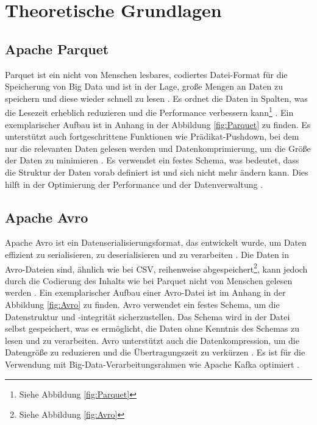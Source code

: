 \chapter{Theoretische Grundlagen}

\section{Apache Parquet}
Parquet ist ein nicht von Menschen lesbares, codiertes Datei-Format für die Speicherung von Big Data und ist in der Lage, große Mengen an Daten zu speichern und diese wieder schnell zu lesen \cite{apache_apache_nodate} \cite[S. 906]{gohil_compendious_2022}. Es ordnet die Daten in Spalten, was die Lesezeit erheblich reduzieren und die Performance verbessern kann\footnote{Siehe Abbildung \ref{fig:Parquet}} \cite[S. 339]{munir_cost-based_2020}. Ein exemplarischer Aufbau ist in Anhang in der Abbildung \ref{fig:Parquet} zu finden. Es unterstützt auch fortgeschrittene Funktionen wie Prädikat-Pushdown, bei dem nur die relevanten Daten gelesen werden und Datenkomprimierung, um die Größe der Daten zu minimieren \cite[S. 268]{plase_comparison_2017}. Es verwendet ein festes Schema, was bedeutet, dass die Struktur der Daten vorab definiert ist und sich nicht mehr ändern kann. Dies hilft in der Optimierung der Performance und der Datenverwaltung \cite{apache_apache_nodate}.

\section{Apache Avro}
Apache Avro ist ein Datenserialisierungsformat, das entwickelt wurde, um Daten effizient zu serialisieren, zu deserialisieren und zu verarbeiten \cite{apache_avro_nodate}. Die Daten in Avro-Dateien sind, ähnlich wie bei CSV, reihenweise abgespeichert\footnote{Siehe Abbildung \ref{fig:Avro}}, kann jedoch durch die Codierung des Inhalts wie bei Parquet nicht von Menschen gelesen werden \cite[S. 338]{munir_cost-based_2020} \cite[S. 906]{gohil_compendious_2022}. Ein exemplarischer Aufbau einer Avro-Datei ist im Anhang in der Abbildung \ref{fig:Avro} zu finden. Avro verwendet ein festes Schema, um die Datenstruktur und -integrität sicherzustellen. Das Schema wird in der Datei selbst gespeichert, was es ermöglicht, die Daten ohne Kenntnis des Schemas zu lesen und zu verarbeiten. Avro unterstützt auch die Datenkompression, um die Datengröße zu reduzieren und die Übertragungszeit zu verkürzen \cite[S. 268]{plase_comparison_2017}. Es ist für die Verwendung mit Big-Data-Verarbeitungsrahmen wie Apache Kafka optimiert \cite[S. 906]{gohil_compendious_2022}.

